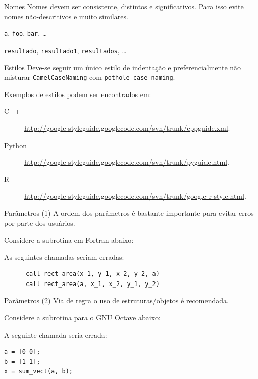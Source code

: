 \documentclass[11pt]{beamer}
\begin{document}
\begin{frame}[fragile]{Nomes}
    Nomes devem ser consistente, distintos e significativos. Para isso evite
    nomes não-descritivos e muito similares.

    \pause
    \begin{example}
        \verb+a+, \verb+foo+, \verb+bar+, \ldots
    \end{example}

    \pause
    \begin{example}
        \verb+resultado+, \verb+resultado1+, \verb+resultados+, \ldots
    \end{example}
\end{frame}

\begin{frame}[fragile]{Estilos}
    Deve-se seguir um único estilo de indentação e preferencialmente não
    misturar \verb+CamelCaseNaming+ com \verb+pothole_case_naming+.

    Exemplos de estilos podem ser encontrados em:
    \begin{description}
        \item[C++]
            \url{http://google-styleguide.googlecode.com/svn/trunk/cppguide.xml}.
        \item[Python]
            \url{http://google-styleguide.googlecode.com/svn/trunk/pyguide.html}.
        \item[R]
            \url{http://google-styleguide.googlecode.com/svn/trunk/google-r-style.html}.
    \end{description}
\end{frame}

\begin{frame}[fragile]{Parâmetros (1)}
    A ordem dos parâmetros é bastante importante para evitar erros por parte
    dos usuários.
    \pause
    \begin{example}
        Considere a subrotina em Fortran abaixo:
        
        As seguintes chamadas seriam erradas:
        \begin{lstlisting}
      call rect_area(x_1, y_1, x_2, y_2, a)
      call rect_area(a, x_1, x_2, y_1, y_2)
        \end{lstlisting}
    \end{example}
\end{frame}

\begin{frame}[fragile]{Parâmetros (2)}
    Via de regra o uso de estruturas/objetos é recomendada.
    \pause
    \begin{example}
        Considere a subrotina para o GNU Octave abaixo:
        
        A seguinte chamada seria errada:
        \begin{lstlisting}
a = [0 0];
b = [1 1];
x = sum_vect(a, b);
        \end{lstlisting}
    \end{example}
\end{frame}
\end{document}

